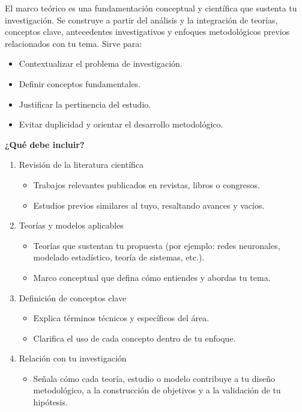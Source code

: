 El marco teórico es una fundamentación conceptual y científica que sustenta tu investigación. Se construye a partir del análisis y la integración de teorías, conceptos clave, antecedentes investigativos y enfoques metodológicos previos relacionados con tu tema. Sirve para:

\begin{itemize}
    \item Contextualizar el problema de investigación.
    \item Definir conceptos fundamentales.
    \item Justificar la pertinencia del estudio.
    \item Evitar duplicidad y orientar el desarrollo metodológico.
\end{itemize}

\textbf{¿Qué debe incluir?}

\begin{enumerate}
    \item Revisión de la literatura científica
    \begin{itemize}
        \item Trabajos relevantes publicados en revistas, libros o congresos.
        \item Estudios previos similares al tuyo, resaltando avances y vacíos.
    \end{itemize}
    \item Teorías y modelos aplicables
    \begin{itemize}
        \item Teorías que sustentan tu propuesta (por ejemplo: redes neuronales, modelado estadístico, teoría de sistemas, etc.).
        \item Marco conceptual que defina cómo entiendes y abordas tu tema.
    \end{itemize}
    \item Definición de conceptos clave
    \begin{itemize}
        \item Explica términos técnicos y específicos del área.
        \item Clarifica el uso de cada concepto dentro de tu enfoque.
    \end{itemize}
    \item Relación con tu investigación
    \begin{itemize}
        \item Señala cómo cada teoría, estudio o modelo contribuye a tu diseño metodológico, a la construcción de objetivos y a la validación de tu hipótesis.
    \end{itemize}
\end{enumerate}

